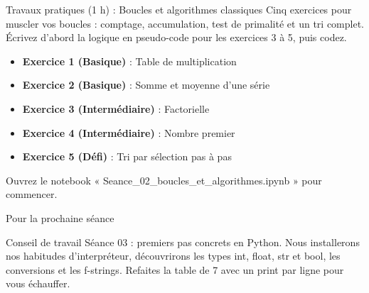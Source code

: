 \documentclass[aspectratio=169,11pt]{beamer}
\begin{document}
\begin{frame}{Travaux pratiques (1 h) : Boucles et algorithmes classiques}
Cinq exercices pour muscler vos boucles : comptage, accumulation, test de primalité et un tri complet. Écrivez d'abord la logique en pseudo-code pour les exercices 3 à 5, puis codez.

\begin{itemize}
  \setlength{\itemsep}{1.5pt}\setlength{\parskip}{0pt}
  \item \textbf{Exercice 1 (Basique)} : Table de multiplication
  \item \textbf{Exercice 2 (Basique)} : Somme et moyenne d'une série
  \item \textbf{Exercice 3 (Intermédiaire)} : Factorielle
  \item \textbf{Exercice 4 (Intermédiaire)} : Nombre premier
  \item \textbf{Exercice 5 (Défi)} : Tri par sélection pas à pas
\end{itemize}
\vspace{4pt}

{\small\color{PyGris}Ouvrez le notebook « Seance\_02\_boucles\_et\_algorithmes.ipynb » pour commencer.}
\end{frame}
\begin{frame}{Pour la prochaine séance}
\begin{exampleblock}{Conseil de travail}
Séance 03 : premiers pas concrets en Python. Nous installerons nos habitudes d'interpréteur, découvrirons les types int, float, str et bool, les conversions et les f-strings. Refaites la table de 7 avec un print par ligne pour vous échauffer.
\end{exampleblock}
\end{frame}
\end{document}
